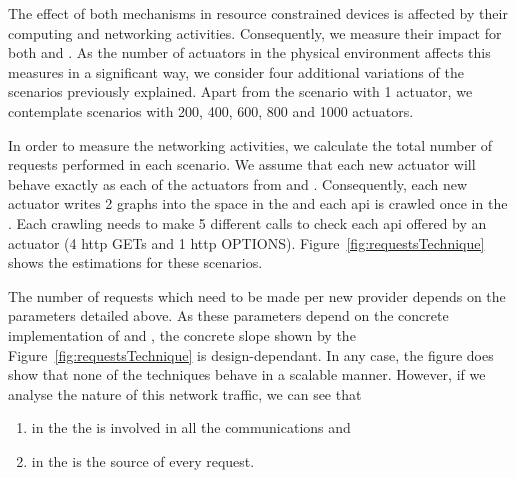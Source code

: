 


\bigskip

The effect of both mechanisms in resource constrained devices is affected by their computing and networking activities.
Consequently, we measure their impact for both \spaceActuation{} and \restActuation{}.
As the number of actuators in the physical environment affects this measures in a significant way,
we consider four additional variations of the scenarios previously explained.
Apart from the scenario with 1 actuator, we contemplate scenarios with 200, 400, 600, 800 and 1000 actuators.


In order to measure the networking activities, we calculate the total number of requests performed in each scenario.
We assume that each new actuator will behave exactly as each of the actuators from \implSpace{} and \implRest{}.
Consequently, each new actuator writes 2 graphs into the space in the \spaceActuation{} and each \ac{api} is crawled once in the \restActuation{}.
Each crawling needs to make 5 different calls to check each \ac{api} offered by an actuator (4 \acs{http} GETs and 1 \acs{http} OPTIONS).
Figure~\ref{fig:requestsTechnique} shows the estimations for these scenarios.




The number of requests which need to be made per new provider depends on the parameters detailed above.
As these parameters depend on the concrete implementation of \nodeProvSpace{} and \nodeProvRest{}, the  concrete slope shown by the Figure~\ref{fig:requestsTechnique} is design-dependant.
In any case, the figure does show that none of the techniques behave in a scalable manner.
However, if we analyse the nature of this network traffic, we can see that
\begin{enumerate}
  \item in the \spaceActuation{} the \Space{} is involved in all the communications and
  \item in the \restActuation{} \nodeConsRest{} is the source of every request.
\end{enumerate}


